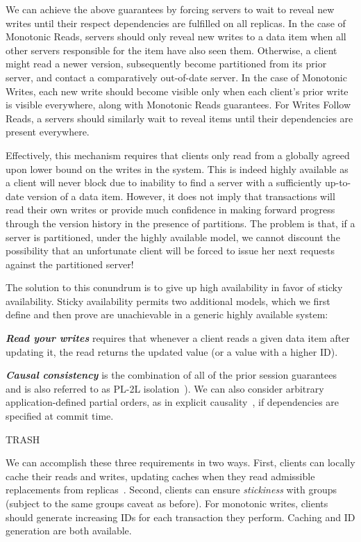 We can achieve the above guarantees by forcing servers to wait to
reveal new writes until their respect dependencies are fulfilled on
all replicas. In the case of Monotonic Reads, servers should only
reveal new writes to a data item when all other servers responsible
for the item have also seen them. Otherwise, a client might read a
newer version, subsequently become partitioned from its prior server,
and contact a comparatively out-of-date server. In the case of
Monotonic Writes, each new write should become visible only when each
client's prior write is visible everywhere, along with Monotonic Reads
guarantees. For Writes Follow Reads, a servers should similarly wait
to reveal items until their dependencies are present
everywhere.

Effectively, this mechanism requires that clients only read from a
globally agreed upon lower bound on the writes in the system. This is
indeed highly available as a client will never block due to inability
to find a server with a sufficiently up-to-date version of a data
item. However, it does not imply that transactions will read their own
writes or provide much confidence in making forward progress through
the version history in the presence of partitions. The problem is
that, if a server is partitioned, under the highly available model, we
cannot discount the possibility that an unfortunate client will be
forced to issue her next requests against the partitioned server!

The solution to this conundrum is to give up high availability in
favor of sticky availability. Sticky availability permits two
additional models, which we first define and then prove are
unachievable in a generic highly available system:

\noindent\textit{\textbf{Read your writes}} requires
that whenever a client reads a given data item after updating it, the
read returns the updated value (or a value with a higher ID).

\vspace{.25em}\noindent\textit{\textbf{Causal consistency}} is the
combination of all of the prior session
guarantees~\cite{daudjee-session} and is also referred to as PL-2L
isolation~\cite{adya}). We can also consider arbitrary
application-defined partial orders, as in explicit
causality~\cite{explicit-socc}, if dependencies are specified at
commit time.





TRASH

We can accomplish these three requirements in two ways. First, clients
can locally cache their reads and writes, updating caches when they
read admissible replacements from
replicas~\cite{sessionguarantees}. Second, clients can ensure
\textit{stickiness} with groups~\cite{vogels-defs} (subject to the
same groups caveat as before).  For monotonic writes, clients should
generate increasing IDs for each transaction they perform. Caching and
ID generation are both available.

